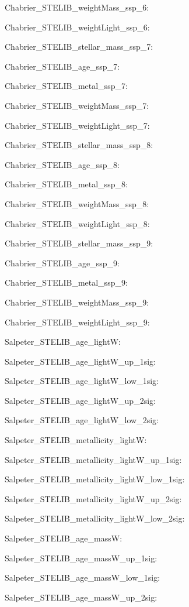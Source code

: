 \item Chabrier\_STELIB\_weightMass\_ssp\_6: 
\item Chabrier\_STELIB\_weightLight\_ssp\_6: 
\item Chabrier\_STELIB\_stellar\_mass\_ssp\_7: 
\item Chabrier\_STELIB\_age\_ssp\_7: 
\item Chabrier\_STELIB\_metal\_ssp\_7: 
\item Chabrier\_STELIB\_weightMass\_ssp\_7: 
\item Chabrier\_STELIB\_weightLight\_ssp\_7: 
\item Chabrier\_STELIB\_stellar\_mass\_ssp\_8: 
\item Chabrier\_STELIB\_age\_ssp\_8: 
\item Chabrier\_STELIB\_metal\_ssp\_8: 
\item Chabrier\_STELIB\_weightMass\_ssp\_8: 
\item Chabrier\_STELIB\_weightLight\_ssp\_8: 
\item Chabrier\_STELIB\_stellar\_mass\_ssp\_9: 
\item Chabrier\_STELIB\_age\_ssp\_9: 
\item Chabrier\_STELIB\_metal\_ssp\_9: 
\item Chabrier\_STELIB\_weightMass\_ssp\_9: 
\item Chabrier\_STELIB\_weightLight\_ssp\_9: 
\item Salpeter\_STELIB\_age\_lightW: 
\item Salpeter\_STELIB\_age\_lightW\_up\_1sig: 
\item Salpeter\_STELIB\_age\_lightW\_low\_1sig: 
\item Salpeter\_STELIB\_age\_lightW\_up\_2sig: 
\item Salpeter\_STELIB\_age\_lightW\_low\_2sig: 
\item Salpeter\_STELIB\_metallicity\_lightW: 
\item Salpeter\_STELIB\_metallicity\_lightW\_up\_1sig: 
\item Salpeter\_STELIB\_metallicity\_lightW\_low\_1sig: 
\item Salpeter\_STELIB\_metallicity\_lightW\_up\_2sig: 
\item Salpeter\_STELIB\_metallicity\_lightW\_low\_2sig: 
\item Salpeter\_STELIB\_age\_massW: 
\item Salpeter\_STELIB\_age\_massW\_up\_1sig: 
\item Salpeter\_STELIB\_age\_massW\_low\_1sig: 
\item Salpeter\_STELIB\_age\_massW\_up\_2sig: 
